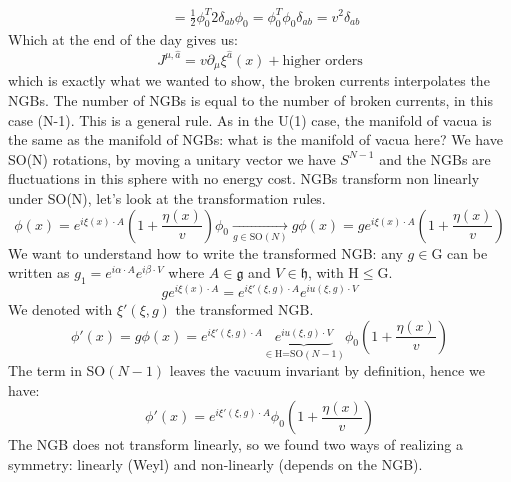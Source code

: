 \documentclass[../main.tex]{subfiles}
\begin{document}
\begin{example}
\begin{align*}
&=\frac{1}{2}\phi_0^T2\delta_{ab}\phi_0=\phi_0^T\phi_0\delta_{ab}=v^2\delta_{ab}
\end{align*}
Which at the end of the day gives us:
\[
J^{\mu,\hat{a}}=v\partial_\mu\xi^{\hat{a}}(x)+\text{higher orders}
\]
which is exactly what we wanted to show, the broken currents interpolates the NGBs. The number of NGBs is equal to the number of broken currents, in this case (N-1). This is a general rule. As in the U(1) case, the manifold of vacua is the same as the manifold of NGBs: what is the manifold of vacua here? We have SO(N) rotations, by moving a unitary vector we have $S^{N-1}$ and the NGBs are fluctuations in this sphere with no energy cost. NGBs transform non linearly under SO(N), let's look at the transformation rules.
\[
\phi(x)=e^{i\xi(x)\cdot A}\left(1+\frac{\eta(x)}{v}\right)\phi_0\xrightarrow[g\in\text{SO}(N)]{}g\phi(x)=ge^{i\xi(x)\cdot A}\left(1+\frac{\eta(x)}{v}\right)
\]
We want to understand how to write the transformed NGB: any $g\in$G can be written as $g_1=e^{i\alpha\cdot A}e^{i\beta\cdot V}$ where $A\in\mathfrak{g}$ and $V\in\mathfrak{h}$, with H$\le$G.
\[
ge^{i\xi(x)\cdot A}=e^{i\xi'(\xi,g)\cdot A}e^{iu(\xi,g)\cdot V}
\]
We denoted with $\xi'(\xi,g)$ the transformed NGB.
\[
\phi'(x)=g\phi(x)=e^{i\xi'(\xi,g)\cdot A}\underbrace{e^{iu(\xi,g)\cdot V}}_{\in\text{H=SO}(N-1)}\phi_0\left(1+\frac{\eta(x)}{v}\right)
\]
The term in SO$(N-1)$ leaves the vacuum invariant by definition, hence we have:
\[
\phi'(x)=e^{i\xi'(\xi,g)\cdot A}\phi_0\left(1+\frac{\eta(x)}{v}\right)
\]
The NGB does not transform linearly, so we found two ways of realizing a symmetry: linearly (Weyl) and non-linearly (depends on the NGB).
\end{example}
\end{document}
